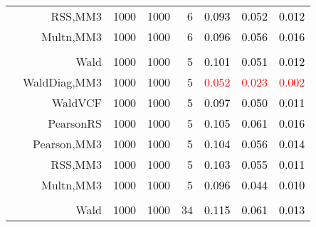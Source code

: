 \documentclass[
]{article}
\begin{document}
\begin{table}[H]
{\begin{tabular}[t]{lrrrrrrr}
\hspace{1em} & RSS,MM3 & 1000 & 1000 & 6 & \textcolor{black}{0.093} & \textcolor{black}{0.052} & \textcolor{black}{0.012}\\

\hspace{1em} & Multn,MM3 & 1000 & 1000 & 6 & \textcolor{black}{0.096} & \textcolor{black}{0.056} & \textcolor{black}{0.016}\\
\cmidrule{1-8}
\addlinespace[0.3em]
\multicolumn{8}{l}{\textbf{2F 10V}}\\
\hspace{1em} & Wald & 1000 & 1000 & 5 & \textcolor{black}{0.101} & \textcolor{black}{0.051} & \textcolor{black}{0.012}\\

\hspace{1em} & WaldDiag,MM3 & 1000 & 1000 & 5 & \textcolor{red}{0.052} & \textcolor{red}{0.023} & \textcolor{red}{0.002}\\

\hspace{1em} & WaldVCF & 1000 & 1000 & 5 & \textcolor{black}{0.097} & \textcolor{black}{0.050} & \textcolor{black}{0.011}\\

\hspace{1em} & PearsonRS & 1000 & 1000 & 5 & \textcolor{black}{0.105} & \textcolor{black}{0.061} & \textcolor{black}{0.016}\\

\hspace{1em} & Pearson,MM3 & 1000 & 1000 & 5 & \textcolor{black}{0.104} & \textcolor{black}{0.056} & \textcolor{black}{0.014}\\

\hspace{1em} & RSS,MM3 & 1000 & 1000 & 5 & \textcolor{black}{0.103} & \textcolor{black}{0.055} & \textcolor{black}{0.011}\\

\hspace{1em} & Multn,MM3 & 1000 & 1000 & 5 & \textcolor{black}{0.096} & \textcolor{black}{0.044} & \textcolor{black}{0.010}\\
\cmidrule{1-8}
\addlinespace[0.3em]
\multicolumn{8}{l}{\textbf{3F 15V}}\\
\hspace{1em} & Wald & 1000 & 1000 & 34 & \textcolor{black}{0.115} & \textcolor{black}{0.061} & \textcolor{black}{0.013}\\


\end{tabular}}
\end{table}
\end{document}
